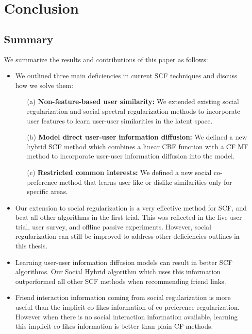 
\chapter{Conclusion}

\section{Summary}

We summarize the results and contributions of this paper as follows:

\begin{itemize}
\item{
We outlined three main deficiencies in current SCF techniques and discuss how we solve them:

\begin{itemize}
\item[(a)] {\bf Non-feature-based user similarity:} 
We extended existing social regularization and social spectral regularization methods to incorporate user features to learn user-user similarities in the latent space.
\item[(b)] {\bf Model direct user-user information diffusion:} 
We defined a new hybrid SCF method which combines a linear CBF function with a CF MF method to incorporate user-user information diffusion into the model. 
\item[(c)] {\bf Restricted common interests:}
We defined a new social co-preference method that learns user like or dislike similarities only for specific areas.
\end{itemize}
}

\item{Our extension to social regularization is a very effective method for SCF, and beat all other algorithms in the first trial. This was reflected in the live user trial, user survey, and offline passive experiments. However, social regularization can still be improved to address other deficiencies outlines in this thesis.}

\item{Learning user-user information diffusion models can result in better SCF algorithms. Our Social Hybrid algorithm which uses this information outperformed all other SCF methods when recommending friend links.}

\item {Friend interaction information coming from social regularization is more useful than the implicit co-likes information of co-preference regularization. However  when there is no social interaction information available, learning this implicit co-likes information is better than plain CF methods.}

\end{itemize}

